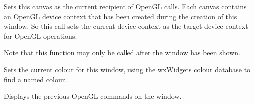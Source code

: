 \label{wxglcanvassetcurrent}


Sets this canvas as the current recipient of OpenGL calls.
Each canvas contains an OpenGL device context that has been created during
the creation of this window. So this call sets the current device context
as the target device context for OpenGL operations.

Note that this function may only be called after the window has been shown.


\label{wxglcanvassetcolour}


Sets the current colour for this window, using the wxWidgets colour database to find a named colour.


\label{wxglcanvasswapbuffers}


Displays the previous OpenGL commands on the window.

